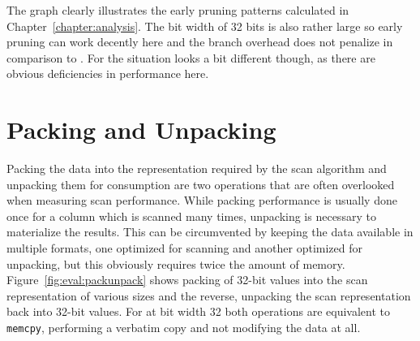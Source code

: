 The graph clearly illustrates the early pruning patterns calculated in
Chapter~\ref{chapter:analysis}. The bit width of 32 bits is also rather large so
early pruning can work decently here and the branch overhead does not penalize
\bwv{} in comparison to \simdscan{}. For \bs{} the situation looks a bit
different though, as there are obvious deficiencies in performance here.

\section{Packing and Unpacking}

Packing the data into the representation required by the scan algorithm and
unpacking them for consumption are two operations that are often overlooked when
measuring scan performance. While packing performance is usually done once for a
column which is scanned many times, unpacking is necessary to materialize the
results. This can be circumvented by keeping the data available in multiple
formats, one optimized for scanning and another optimized for unpacking, but
this obviously requires twice the amount of memory.
Figure~\ref{fig:eval:packunpack} shows packing of 32-bit values into the scan
representation of various sizes and the reverse, unpacking the scan
representation back into 32-bit values. For \simdscan{} at bit width 32 both
operations are equivalent to \texttt{memcpy}, performing a verbatim copy and not
modifying the data at all.

